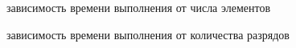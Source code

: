\documentclass[a4paper]{article}
\begin{document}
\begin{figure}[!]
	\caption{зависимость времени выполнения от числа элементов}
	\label{image1}
\end{figure}

\begin{figure}[!]

	\caption{зависимость времени выполнения от количества разрядов}
	\label{image2}
\end{figure}
\end{document}
